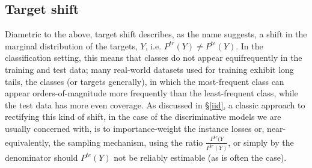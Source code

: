 \subsection{Target shift}\label{ssec:label-shift}
Diametric to the above, target shift describes, as the name suggests, a shift in the
marginal distribution of the targets, \(Y\), i.e. \( P^{tr}(Y) \neq P^{te}(Y) \).
%
In the classification setting, this means that classes do not appear equifrequently in the training
and test data; many real-world datasets used for training exhibit long tails, \wrt{} the classes
(or targets generally), in which the most-frequent class can appear orders-of-magnitude more
frequently than the least-frequent class, while the test data has more even coverage.
%
As discussed in \S\ref{iid}, a classic approach to rectifying this kind of shift, in the case of
the discriminative models we are usually concerned with, is to  importance-weight the instance
losses or, near-equivalently, the sampling mechanism, using the ratio \(\frac{P^{te}(Y}{P^{tr}(Y)}
\), or simply by the denominator should \( P^{te}(Y)\) not be reliably estimable (as is often the
case).
%
%

